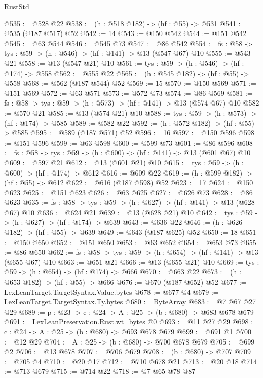 \begin{lexlean}{RustStd}
\begin{coremodule}
@535 := @528 @22
@538 := (h : @518 @182) -> (hf : @55) -> @531
@541 := @535 (@187 @517) @52
@542 := 14
@543 := @150 @542
@544 := @151 @542
@545 := @63 @544
@546 := @545 @73
@547 := @86 @542
@554 := {fs : @58} -> {tys : @59} -> (h : @546) -> (hf : @141) -> @13 (@547 @67) @10
@555 := @543 @21
@558 := @13 (@547 @21) @10
@561 := {tys : @59} -> (h : @546) -> (hf : @174) -> @558
@562 := @555 @22
@565 := (h : @545 @182) -> (hf : @55) -> @558
@568 := @562 (@187 @544) @52
@569 := 15
@570 := @150 @569
@571 := @151 @569
@572 := @63 @571
@573 := @572 @73
@574 := @86 @569
@581 := {fs : @58} -> {tys : @59} -> (h : @573) -> (hf : @141) -> @13 (@574 @67) @10
@582 := @570 @21
@585 := @13 (@574 @21) @10
@588 := {tys : @59} -> (h : @573) -> (hf : @174) -> @585
@589 := @582 @22
@592 := (h : @572 @182) -> (hf : @55) -> @585
@595 := @589 (@187 @571) @52
@596 := 16
@597 := @150 @596
@598 := @151 @596
@599 := @63 @598
@600 := @599 @73
@601 := @86 @596
@608 := {fs : @58} -> {tys : @59} -> (h : @600) -> (hf : @141) -> @13 (@601 @67) @10
@609 := @597 @21
@612 := @13 (@601 @21) @10
@615 := {tys : @59} -> (h : @600) -> (hf : @174) -> @612
@616 := @609 @22
@619 := (h : @599 @182) -> (hf : @55) -> @612
@622 := @616 (@187 @598) @52
@623 := 17
@624 := @150 @623
@625 := @151 @623
@626 := @63 @625
@627 := @626 @73
@628 := @86 @623
@635 := {fs : @58} -> {tys : @59} -> (h : @627) -> (hf : @141) -> @13 (@628 @67) @10
@636 := @624 @21
@639 := @13 (@628 @21) @10
@642 := {tys : @59} -> (h : @627) -> (hf : @174) -> @639
@643 := @636 @22
@646 := (h : @626 @182) -> (hf : @55) -> @639
@649 := @643 (@187 @625) @52
@650 := 18
@651 := @150 @650
@652 := @151 @650
@653 := @63 @652
@654 := @653 @73
@655 := @86 @650
@662 := {fs : @58} -> {tys : @59} -> (h : @654) -> (hf : @141) -> @13 (@655 @67) @10
@663 := @651 @21
@666 := @13 (@655 @21) @10
@669 := {tys : @59} -> (h : @654) -> (hf : @174) -> @666
@670 := @663 @22
@673 := (h : @653 @182) -> (hf : @55) -> @666
@676 := @670 (@187 @652) @52
@677 := LexLeanTarget.TargetSyntax.Value.bytes
@678 := @677 @4
@679 := LexLeanTarget.TargetSyntax.Ty.bytes
@680 := ByteArray
@683 := @7 @67 @27 @29
@689 := {p : @23} -> {c : @24} -> {A : @25} -> (b : @680) -> @683 @678 @679
@691 := LexLeanPreservation.Rust.wt_bytes @0
@693 := @11 @27 @29
@698 := {c : @24} -> {A : @25} -> (b : @680) -> @693 @678 @679
@699 := @691 @1
@700 := @12 @29
@704 := {A : @25} -> (b : @680) -> @700 @678 @679
@705 := @699 @2
@706 := @13 @678
@707 := @706 @679
@708 := (b : @680) -> @707
@709 := @705 @4
@710 := @20 @17
@712 := @710 @678 @21
@713 := @20 @18
@714 := @713 @679
@715 := @714 @22
@718 := @7 @65 @78 @87

\end{coremodule}
\end{lexlean}
